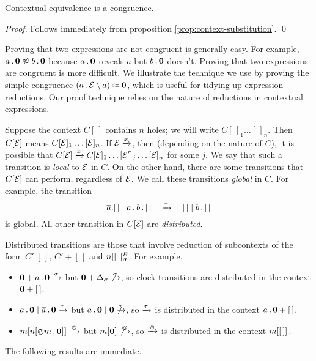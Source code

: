 \documentclass[orivec,envcountsame]{llncs}
\newcommand{\Eq}{\approx}
\newcommand{\NotEq}{\not\approx}
\newcommand{\Does}[1]{\xderives{#1}}
\begin{document}
\begin{theorem}
Contextual equivalence is a congruence.
\end{theorem}
\begin{proof}
Follows immediately from proposition \ref{prop:context-substitution}.
\qed \end{proof}


Proving that two expressions are not congruent is generally easy. For example, $a\pref\nil \NotEq b\pref\nil$ because $a\,.\,\textbf{0}$ reveals $a$ but $b\,.\,\textbf{0}$ doesn't. Proving that two expressions are congruent is more difficult. We illustrate the technique we use by proving the simple congruence $\left(a\pref\expr \res{a}\right) \Eq \nil$, which is useful for tidying up expression reductions. Our proof technique relies on the nature of reductions in contextual expressions.

Suppose the context $C[\,]$ contains $n$ holes; we will write
$C[\,]_1\dots[\,]_n$. Then $C[\text{$\mathcal{E}$}]$ means $C[\text{$\mathcal{E}$}]_1\dots[\text{$\mathcal{E}$}]_n$. If
$\expr \Does{x}$, then (depending on the nature of $C$), it is possible that
$C[\expr] \Does{x} C[\expr]_1\dots[\expr']_j\dots[\expr]_n$ for some $j$. We say that
such a transition is \emph{local} to $\text{$\mathcal{E}$}$ in $C$. On the other hand, there
are some transitions that $C[\text{$\mathcal{E}$}]$ can perform, regardless of $\text{$\mathcal{E}$}$. We call
these transitions \emph{global} in $C$. For example, the transition 
\[
\out{a}.[\,] \mid a \pref b \pref [\,] \quad\Does{\tau}\quad [\,] \mid b \pref [\,] \]
is global. All other transition in $C[\text{$\mathcal{E}$}]$ are \emph{distributed}.

Distributed transitions are those that involve reduction of subcontexts of the form $C'|[\,]$, $C' + [\,]$ and $\locv{n}{[\,]}{B}{\vec{\sigma}}$. For example,
\begin{itemize}
\item
    $\nil + a\pref\nil \Does{\sigma}$ but $\nil + \Delta_\sigma \not\Does{\sigma}$, so clock transitions are distributed in the context $\textbf{0} + [\,]$.
\item
    $a\pref\nil \mid \out{a}\pref\nil \Does{\tau}$ but $a\pref\nil \mid \nil \not\Does{\tau}$, so $\Does{\tau}$ is distributed in the context $a\,.\,\textbf{0} + [\,]$.
\item
    $\locv{m}{ \locv{n}{\tntout{m}\pref\nil}{}{} }{}{} \Does{\tout}$ but
    $\locv{m}{ \nil }{}{} \not\Does{\tout}$, so $\Does{\tout}$ is distributed in the context ${m}[  [\,]  ]^{}_{}$.
\end{itemize}
The following results are immediate.
\end{document}
